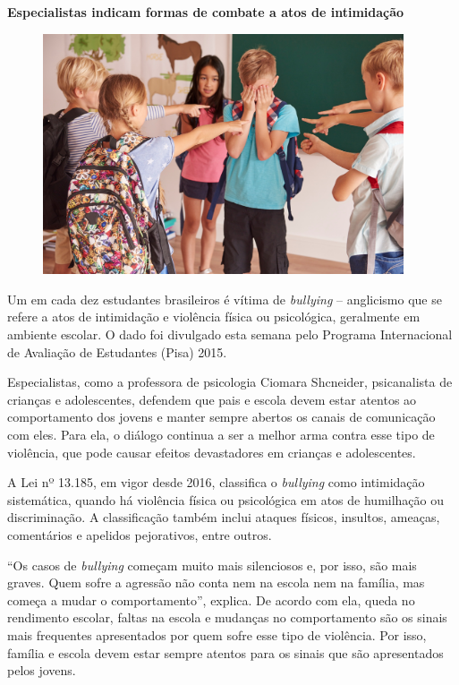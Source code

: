 \begin{myquote}

\textbf{Especialistas indicam formas de combate a atos de intimidação}

\begin{figure}[H]
\centering
\includegraphics[width=0.95\textwidth]{./imgSAEB_7_POR/media/image38.png}
\end{figure}

Um em cada dez estudantes brasileiros é vítima de \textit{bullying} -- anglicismo
que se refere a atos de intimidação e violência física ou psicológica,
geralmente em ambiente escolar. O dado foi divulgado esta semana pelo
Programa Internacional de Avaliação de Estudantes (Pisa) 2015.

Especialistas, como a professora de psicologia Ciomara Shcneider,
psicanalista de crianças e adolescentes, defendem que pais e escola
devem estar atentos ao comportamento dos jovens e manter sempre abertos
os canais de comunicação com eles. Para ela, o diálogo continua a ser a
melhor arma contra esse tipo de violência, que pode causar efeitos
devastadores em crianças e adolescentes.

A Lei nº 13.185, em vigor desde 2016, classifica o \textit{bullying} como
intimidação sistemática, quando há violência física ou psicológica em
atos de humilhação ou discriminação. A classificação também inclui
ataques físicos, insultos, ameaças, comentários e apelidos pejorativos,
entre outros.

``Os casos de \textit{bullying} começam muito mais silenciosos e, por isso, são
mais graves. Quem sofre a agressão não conta nem na escola nem na
família, mas começa a mudar o comportamento'', explica. De acordo com
ela, queda no rendimento escolar, faltas na escola e mudanças no
comportamento são os sinais mais frequentes apresentados por quem sofre
esse tipo de violência. Por isso, família e escola devem estar sempre
atentos para os sinais que são apresentados pelos jovens.


\end{myquote}

